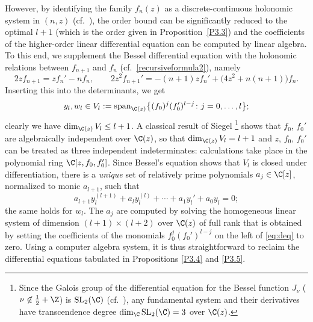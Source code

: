 \documentclass[pdftex]{sigma}
\numberwithin{equation}{section}
\theoremstyle{definition}
\begin{document}
However, by identifying the family $f_n(z)$ as a discrete-continuous holonomic system in $(n,z)$ (cf.\ \cite[p.~322]{Z}), the order bound can be significantly reduced to the optimal $l+1$ (which is the order given in Proposition~\ref{P3.3}) and the coefficients of the higher-order linear differential equation can be computed by linear algebra.
To this end, we supplement the Bessel differential equation with the holonomic relations between $f_{n+1}$ and $f_n$ (cf.\ \eqref{recursiveformula2}), namely
\[
2 z f_{n+1} = z f_n' - n f_n,\qquad 2z^2 f_{n+1}' = -(n+1) z f_n' + \bigl(4z^2 + n(n+1)\bigr)f_n.
\]
Inserting this into the determinants, we get
\[
y_l, w_l \in V_l := \text{span}_{\C(z)}\big\{ (f_0)^j (f_0')^{l-j}\colon j=0,\ldots,l\big\};
\]
clearly we have $\dim_{\C(z)} V_l \leq l+1$. A classical result of Siegel \cite[Satz 9]{S29}\footnote{{Since the Galois group of the differential equation for the Bessel function $J_\nu$ ($\nu\not\in \frac{1}{2} + \Z$) is $\text{SL}_2(\C)$ (cf.~\cite[Appendix]{K68}), any fundamental system and their derivatives have transcendence degree $\dim_{\C} \text{SL}_2(\C) = 3$ over $\C(z)$.}} shows that $f_0$, $f_0'$ are algebraically independent over $\C(z)$, so that $\dim_{\C(z)} V_l = l+1$ and $z$, $f_0$, $f_0'$ can be treated as three independent indeterminates: calculations take place in the polynomial ring $\C[z,f_0,f_0']$. Since Bessel's equation shows that $V_l$ is closed under differentiation, there is a {\em unique} set of relatively prime polynomials $a_j \in \C[z]$, normalized to monic $a_{l+1}$, such that
\begin{equation}\label{eq:deq}
a_{l+1} y_l^{(l+1)} + a_l y_l^{(l)} + \cdots + a_1 y_l' + a_0 y_l = 0;
\end{equation}
the same holds for $w_l$. The $a_j$ are computed by solving the homogeneous linear system of dimension $(l+1)\times (l+2)$ over
$\C(z)$ of full rank that is obtained by setting the coefficients of the monomials $f_0^j (f_0')^{l-j}$ on the left of \eqref{eq:deq} to zero. Using a computer algebra system, it is thus straightforward to reclaim the differential equations tabulated in Propositions \ref{P3.4} and \ref{P3.5}.
\end{document}
